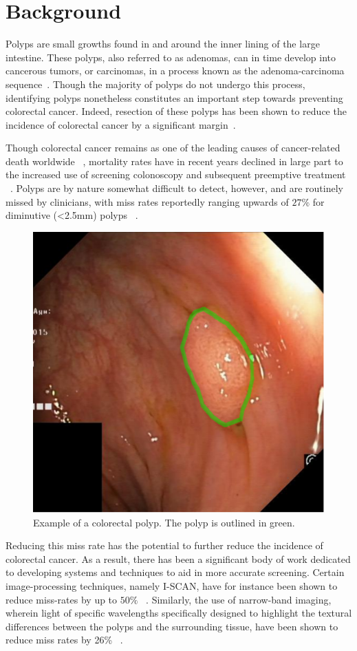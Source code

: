 \chapter{Background} \label{background}
Polyps are small growths found in and around the inner lining of the large intestine. These polyps, also referred to as adenomas, can in time develop into cancerous tumors, or carcinomas, in a process known as the adenoma-carcinoma sequence~\cite{ACS}. Though the majority of polyps do not undergo this process, identifying polyps nonetheless constitutes an important step towards preventing colorectal cancer. Indeed, resection of these polyps has been shown to reduce the incidence of colorectal cancer by a significant margin~\cite{resection}. 

Though colorectal cancer remains as one of the leading causes of cancer-related death worldwide ~\cite{colorectal_cancer}, mortality rates have in recent years declined in large part to the increased use of screening colonoscopy and subsequent preemptive treatment ~\cite{screening}. Polyps are by nature somewhat difficult to detect, however, and are routinely missed by clinicians, with miss rates reportedly ranging upwards of $27\%$ for diminutive (<2.5mm) polyps ~\cite{missrate1, missrate2}.
\begin{figure}
    \centering
    \includegraphics[width=0.75\linewidth]{illustrations/polyp.png}
    \caption{Example of a colorectal polyp. The polyp is outlined in green.}
    \label{fig:polyp}
\end{figure}
Reducing this miss rate has the potential to further reduce the incidence of colorectal cancer. As a result, there has been a significant body of work dedicated to developing systems and techniques to aid in more accurate screening. Certain image-processing techniques, namely I-SCAN, have for instance been shown to reduce miss-rates by up to $50\%$ ~\cite{i-scan}. Similarly, the use of narrow-band imaging, wherein light of specific wavelengths specifically designed to highlight the textural differences between the polyps and the surrounding tissue, have been shown to reduce miss rates by 26\% ~\cite{nbi}. 


